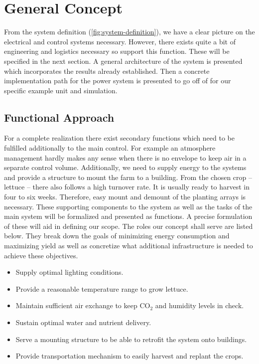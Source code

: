 \section{General Concept}
\label{sec:concept}
From the system definition (\ref{fig:system-definition}), we have a clear picture on the electrical and control systems necessary.
However, there exists quite a bit of engineering and logistics necessary so support this function.
These will be specified in the next section.
A general architecture of the system is presented which incorporates the results already established.
Then a concrete implementation path for the power system is presented to go off of for our specific example unit and simulation.

\subsection{Functional Approach}
\label{sub:func-appr}
For a complete realization there exist secondary functions which need to be fulfilled additionally to the main control.
For example an atmosphere management hardly makes any sense when there is no envelope to keep air in a separate control volume.
Additionally, we need to supply energy to the systems and provide a structure to mount the farm to a building.
From the chosen crop -- lettuce -- there also follows a high turnover rate.
It is usually ready to harvest in four to six weeks.
Therefore, easy mount and demount of the planting arrays is necessary.
These supporting components to the system as well as the tasks of the main system will be formalized and presented as functions.
A precise formulation of these will aid in defining our scope. %
The roles our concept shall serve are listed below.
They break down the goals of minimizing energy consumption and maximizing yield as well as concretize what additional infrastructure is needed to achieve these objectives.
\begin{itemize}
	\item Supply optimal lighting conditions.
	\item Provide a reasonable temperature range to grow lettuce.
	\item Maintain sufficient air exchange to keep CO$_2$ and humidity levels in check.
	\item Sustain optimal water and nutrient delivery.
	\item Serve a mounting structure to be able to retrofit the system onto buildings.
	\item Provide transportation mechanism to easily harvest and replant the crops.
\end{itemize}


